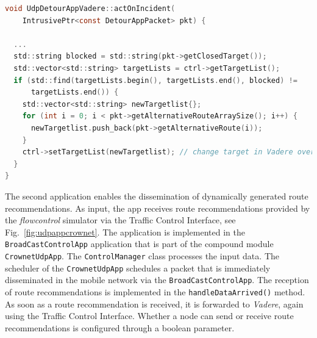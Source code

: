 \begin{lstlisting}[float,floatplacement=hbt!,caption={\lstinline{actOnIncident()} method of the \lstinline{UdpDetourAppVadere} application. The application is intended for simple crowd management applications with static detour information. It is assumed that all pedestrians follow route recommendations: When a route recommendation is received, the target of the agent is directly changed over the Traffic Control interface.},language=C, label=lst:udpdetourapp]
void UdpDetourAppVadere::actOnIncident(
    IntrusivePtr<const DetourAppPacket> pkt) {
    
  ...
  std::string blocked = std::string(pkt->getClosedTarget());
  std::vector<std::string> targetLists = ctrl->getTargetList();
  if (std::find(targetLists.begin(), targetLists.end(), blocked) !=
      targetLists.end()) {
    std::vector<std::string> newTargetlist{};
    for (int i = 0; i < pkt->getAlternativeRouteArraySize(); i++) {
      newTargetlist.push_back(pkt->getAlternativeRoute(i));
    }
    ctrl->setTargetList(newTargetlist); // change target in Vadere over TraCI
  }
}
\end{lstlisting}

The second application enables the dissemination of dynamically generated route recommendations. As input, the app receives route recommendations provided by the \textit{flowcontrol} simulator via the Traffic Control Interface, see Fig.~\ref{fig:udpappcrownet}. The application is implemented in the \lstinline{BroadCastControlApp} application that is part of the compound module \lstinline{CrownetUdpApp}.
The \lstinline{ControlManager} class processes the input data.\textit{}
The scheduler of the \lstinline{CrownetUdpApp} schedules a packet that is immediately disseminated in the mobile network via the \lstinline{BroadCastControlApp}. The reception of route recommendations is implemented in the \lstinline{handleDataArrived()} method. As soon as a   route recommendation is received, it is forwarded to \textit{Vadere}, again using the Traffic Control Interface. Whether a node can send or receive route recommendations is configured through a boolean parameter.


